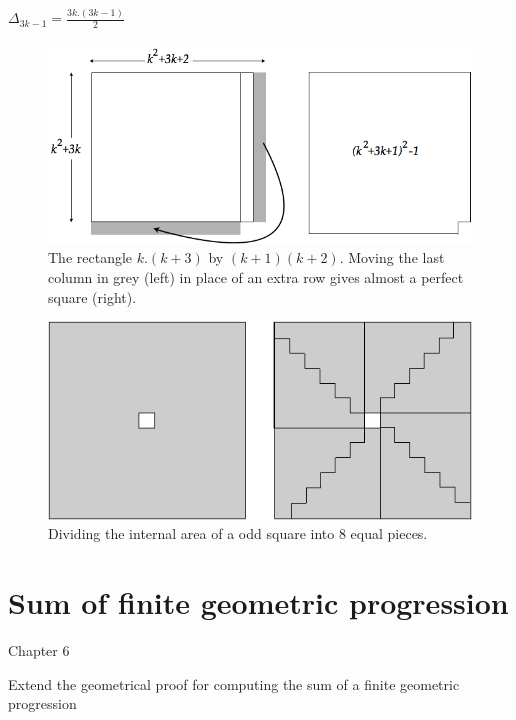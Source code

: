 \documentclass{article}[12pt]
\begin{document}
$\Delta_{3k-1} = \frac{3k.(3k-1)}{2}$
\begin{figure}[h]
\begin{center}
        \includegraphics[scale=0.5]{FiguresArithmetic/Product4consecutivePhase1} 
        \caption{The rectangle $k.(k+3)$ by $(k+1)(k+2)$. Moving the last column in grey (left) 
        in place of an extra row gives almost a perfect square (right).}
\end{center}
\end{figure}
\begin{figure}[h]
\begin{center}
        \includegraphics[scale=0.5]{FiguresArithmetic/Product4consecutivePhase2} 
        \caption{Dividing the internal area of a odd square into $8$ equal pieces.}
\end{center}
\end{figure}

\section{Sum of finite geometric progression}

Chapter 6

Extend the geometrical proof for computing the sum of a finite geometric progression 
\end{document}
